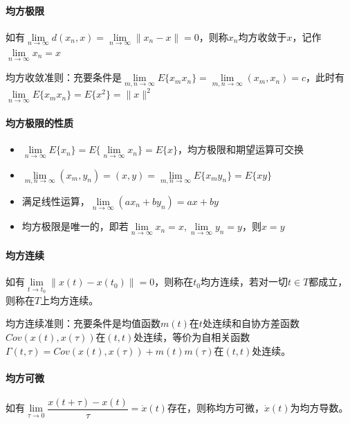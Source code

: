 \documentclass[11pt,a4paper]{ctexart}
\begin{document}
            \paragraph{均方极限}\leavevmode

            如有$\lim\limits_{n\rightarrow\infty}d(x_n,x)=\lim\limits_{n\rightarrow\infty}\|x_n-x\|=0$，则称$x_n$均方收敛于$x$，记作$\lim\limits_{n\rightarrow\infty}x_n=x$

            均方收敛准则：充要条件是$\lim\limits_{m,n\rightarrow\infty}E\{x_mx_n\}=\lim\limits_{m,n\rightarrow\infty}(x_m,x_n)=c$，此时有$\lim\limits_{n\rightarrow\infty}E\{x_mx_n\}=E\{x^2\}=\|x\|^2$
            \paragraph{均方极限的性质}
            \begin{itemize}
                \item $\lim\limits_{n\rightarrow\infty}E\{x_n\}=E\{\lim\limits_{n\rightarrow\infty}x_n\}=E\{x\}$，均方极限和期望运算可交换
                \item $\lim\limits_{m,n\rightarrow\infty}(x_m,y_n)=(x,y)=\lim\limits_{m,n\rightarrow\infty}E\{x_my_n\}=E\{xy\}$
                \item 满足线性运算，$\lim\limits_{n\rightarrow\infty}(ax_n+by_n)=ax+by$
                \item 均方极限是唯一的，即若$\lim\limits_{n\rightarrow\infty}x_n=x,\lim\limits_{n\rightarrow\infty}y_n=y$，则$x=y$
            \end{itemize}

            \paragraph{均方连续}\leavevmode

            如有$\lim\limits_{t\rightarrow t_0}\|x(t)-x(t_0)\|=0$，则称在$t_0$均方连续，若对一切$t\in T$都成立，则称在$T$上均方连续。

            均方连续准则：充要条件是均值函数$m(t)$在$t$处连续和自协方差函数$Cov(x(t),x(\tau))$在$(t,t)$处连续，等价为自相关函数$\varGamma(t,\tau)=Cov(x(t),x(\tau))+m(t)m(\tau)$在$(t,t)$处连续。

            \paragraph{均方可微}\leavevmode

            如有$\lim\limits_{\tau\rightarrow0}\dfrac{x(t+\tau)-x(t)}{\tau}=\dot x(t)$存在，则称均方可微，$\dot x(t)$为均方导数。
\end{document}
